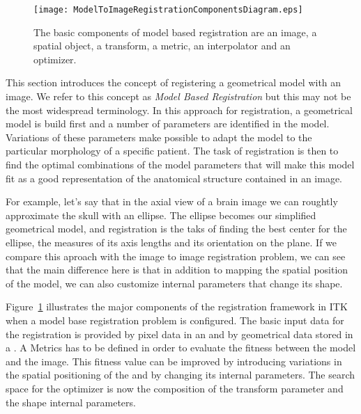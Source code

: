 %
%
%
%
%
%

\begin{figure}
\center
\texttt{[image: ModelToImageRegistrationComponentsDiagram.eps]}
\caption[Model to Image Registration Framework Components]{The basic components
  of model based registration are an image, a spatial object, a transform, a
    metric, an interpolator and an optimizer.}
\label{fig:ModelToImageRegistrationComponentsDiagram}
\end{figure}


This section introduces the concept of registering a geometrical model with an
image. We refer to this concept as \emph{Model Based Registration} but this may
not be the most widespread terminology. In this approach for registration, a
geometrical model is build first and a number of parameters are identified in
the model. Variations of these parameters make possible to adapt the model to
the particular morphology of a specific patient. The task of registration is
then to find the optimal combinations of the model parameters that will make
this model fit as a good representation of the anatomical structure contained
in an image. 

For example, let's say that in the axial view of a brain image we can roughtly
approximate the skull with an ellipse. The ellipse becomes our simplified
geometrical model, and registration is the taks of finding the best center for
the ellipse, the measures of its axis lengths and its orientation on the plane.
If we compare this aproach with the image to image registration problem, we can
see that the main difference here is that in addition to mapping the spatial
position of the model, we can also customize internal parameters that change
its shape.

Figure~\ref{fig:ModelToImageRegistrationComponentsDiagram} illustrates the
major components of the registration framework in ITK when a model base
registration problem is configured. The basic input data for the registration
is provided by pixel data in an  and by geometrical data stored
in a . A Metrics has to be defined in order to evaluate
the fitness between the model and the image. This fitness value can be improved
by introducing variations in the spatial positioning of the
 and by changing its internal parameters. The search
space for the optimizer is now the composition of the transform parameter and
the shape internal parameters.

